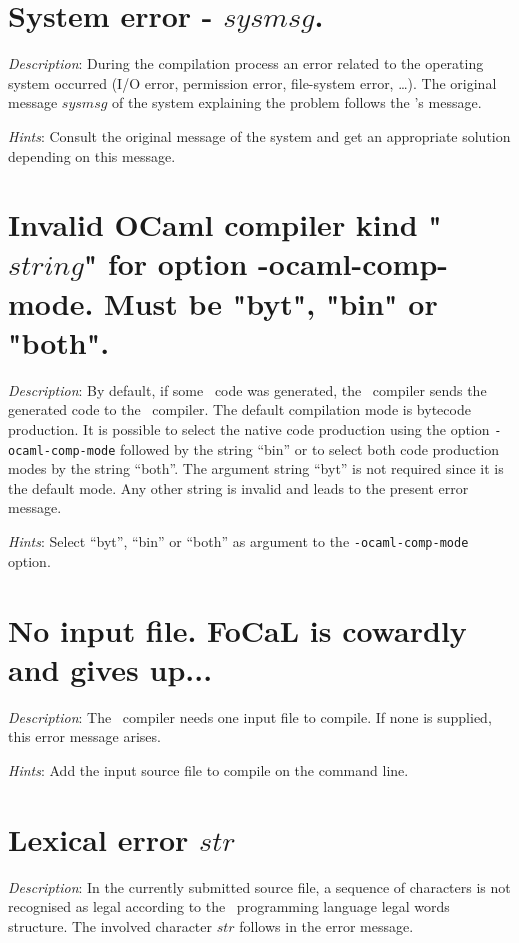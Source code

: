 \section*{System error - $sysmsg$.}
{\em Description}: During the compilation process an error related to
the operating system occurred (I/O error, permission error, file-system
error, \ldots). The original message $sysmsg$ of the system explaining
the problem follows the \focal's message.

{\em Hints}: Consult the original message of the system and get an
appropriate solution depending on this message.



\section*{Invalid OCaml compiler kind "$string$" for option -ocaml-comp-mode. Must be "byt", "bin" or "both".}
{\em Description}: By default, if some \ocaml\ code was generated, the
\focal\ compiler sends the generated code to the \ocaml\ compiler. The
default compilation mode is bytecode production. It is possible to
select the native code production using the option {\tt -ocaml-comp-mode}
followed by the string ``bin'' or to select both code production modes
by the string ``both''. The argument string ``byt'' is not required
since it is the default mode. Any other string is invalid and leads to
the present error message.

{\em Hints}: Select ``byt'', ``bin'' or ``both'' as argument to the
{\tt -ocaml-comp-mode} option.



\section*{No input file. FoCaL is cowardly and gives up...}
{\em Description}: The \focal\ compiler needs one input file to
compile. If none is supplied, this error message arises.

{\em Hints}: Add the input source file to compile on the command
line.



\section*{Lexical error $str$}
{\em Description}: In the currently submitted source file, a sequence
of characters is not recognised as legal according to the
\focal\ programming language legal words structure. The involved
character $str$ follows in the error message.

